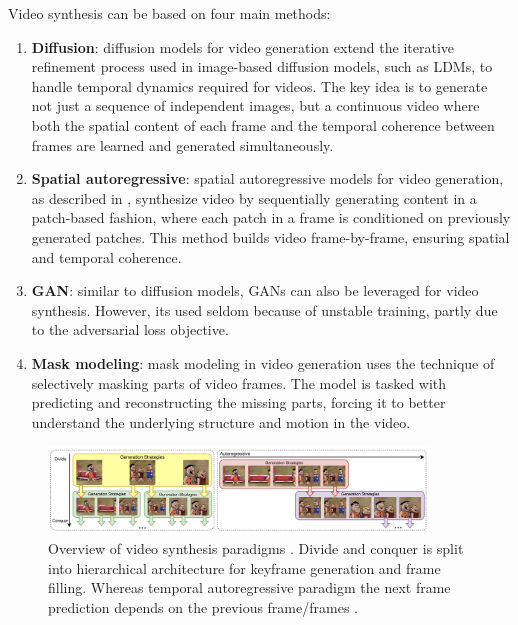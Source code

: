 Video synthesis can be based on four main methods:

\begin{enumerate}
    \item \textbf{Diffusion}: diffusion models for video generation extend the iterative refinement process used in image-based diffusion models, such as LDMs, to handle temporal dynamics required for videos. The key idea is to generate not just a sequence of independent images, but a continuous video where both the spatial content of each frame and the temporal coherence between frames are learned and generated simultaneously.
    \item \textbf{Spatial autoregressive}: spatial autoregressive models for video generation, as described in \cite{graves2013generating}, synthesize video by sequentially generating content in a patch-based fashion, where each patch in a frame is conditioned on previously generated patches. This method builds video frame-by-frame, ensuring spatial and temporal coherence.
    \item \textbf{GAN}: similar to diffusion models, GANs can also be leveraged for video synthesis. However, its used seldom because of unstable training, partly due to the adversarial loss objective.
    \item \textbf{Mask modeling}: mask modeling in video generation uses the technique of selectively masking parts of video frames. The model is tasked with predicting and reconstructing the missing parts, forcing it to better understand the underlying structure and motion in the video.
\end{enumerate}

\begin{figure}
    \centering
    \includegraphics[width=0.9\textwidth]{images/video_synthesis/paradigms.png}
    \caption{Overview of video synthesis paradigms \cite{long_video_survey}. Divide and conquer is split into hierarchical architecture for keyframe generation and frame filling. Whereas temporal autoregressive paradigm the next frame prediction depends on the previous frame/frames \cite{long_video_survey}.}
    \label{fig:video_synthesis_paradigms}
\end{figure}

